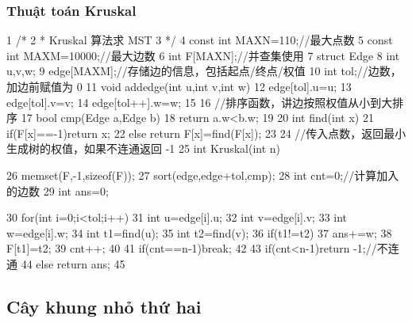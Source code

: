 \documentclass[11pt]{article}
\begin{document}
\subsubsection{Thuật toán Kruskal}

\begin{Code}
 1   /*
 2    * Kruskal 算法求 MST
 3    */
 4   const int MAXN=110;//最大点数
 5   const int MAXM=10000;//最大边数
 6   int F[MAXN];//并查集使用
 7   struct Edge{
 8       int u,v,w;
 9   }edge[MAXM];//存储边的信息，包括起点/终点/权值
10   int tol;//边数，加边前赋值为 0
11   void addedge(int u,int v,int w){
12       edge[tol].u=u;
13       edge[tol].v=v;
14       edge[tol++].w=w;
15   }
16   //排序函数，讲边按照权值从小到大排序
17   bool cmp(Edge a,Edge b){
18       return a.w<b.w;
19   }
20   int find(int x){
21       if(F[x]==-1)return x;
22       else return F[x]=find(F[x]);
23   }
24   //传入点数，返回最小生成树的权值，如果不连通返回 -1
25   int Kruskal(int n){
26       memset(F,-1,sizeof(F));
27       sort(edge,edge+tol,cmp);
28       int cnt=0;//计算加入的边数
29       int ans=0;


30         for(int i=0;i<tol;i++){
31             int u=edge[i].u;
32             int v=edge[i].v;
33             int w=edge[i].w;
34             int t1=find(u);
35             int t2=find(v);
36             if(t1!=t2){
37                 ans+=w;
38                 F[t1]=t2;
39                 cnt++;
40             }
41             if(cnt==n-1)break;
42         }
43         if(cnt<n-1)return -1;//不连通
44         else return ans;
45 }
\end{Code}

\subsection{Cây khung nhỏ thứ hai}
\end{document}
